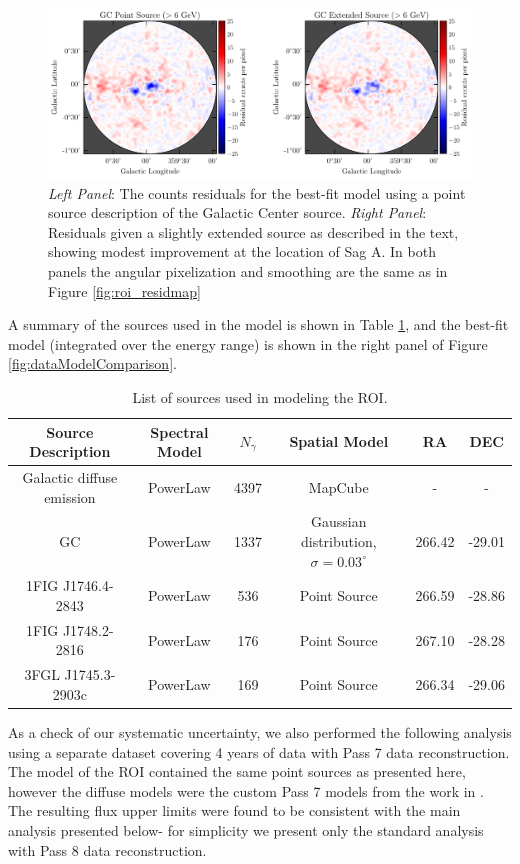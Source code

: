 \begin{figure}[ht] 
\begin{center}
\includegraphics[width=0.9\columnwidth]{figures/residComparison.pdf}
\noindent
\caption{ 
\label{fig:residmapComparison}
{\it Left Panel}: The counts residuals for the best-fit model using a point source description of the Galactic Center source.
{\it Right Panel}: Residuals given a slightly extended source as described in the text, showing modest improvement at the location of Sag A. In both panels the angular pixelization and smoothing are the same as in Figure \ref{fig:roi_residmap}}
\end{center}
\end{figure}

A summary of the sources used in the model is shown in Table \ref{tab:model}, and the best-fit model (integrated over the energy range) is shown in the right panel of Figure \ref{fig:dataModelComparison}.

\begin{table}[ht]
\begin{tabularx}{\textwidth}{c @{\extracolsep{\fill}} ccccc}
\hline \hline
Source Description & Spectral Model & $N_{\gamma}$ & Spatial Model & RA & DEC\\ \hline
Galactic diffuse emission & PowerLaw & 4397 & MapCube & - & - \\ 
GC & PowerLaw & 1337 & Gaussian distribution, $\sigma = 0.03^{\circ}$ & 266.42 & -29.01 \\
1FIG J1746.4-2843 & PowerLaw & 536 & Point Source & 266.59 & -28.86 \\
1FIG J1748.2-2816 & PowerLaw & 176 & Point Source & 267.10 & -28.28 \\
3FGL J1745.3-2903c & PowerLaw & 169 & Point Source & 266.34 & -29.06 \\
\hline
\end{tabularx}
\caption{ \label{tab:model} List of sources used in modeling the ROI. }
\end{table}

As a check of our systematic uncertainty, we also performed the following analysis using a separate dataset covering 4 years of data with Pass 7 data reconstruction.
The model of the ROI contained the same point sources as presented here, however the diffuse models were the custom Pass 7 models from the work in \citep{GC2016}. 
The resulting flux upper limits were found to be consistent with the main analysis presented below- for simplicity we present only the standard analysis with Pass 8 data reconstruction.


